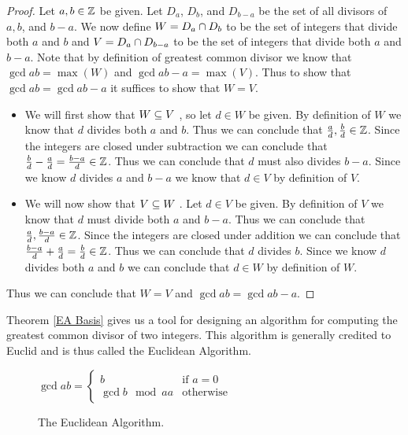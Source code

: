         \begin{proof}
            Let $a, b \in \mathbb{Z}$ be given. Let $D_a$, $D_b$,  and $D_{b - a}$ be the set of all divisors
            of $a, b$, and $b - a$. We now define $W = D_a \cap D_b$ to be the set of integers that
            divide both $a$ and $b$ and $V = D_a \cap D_{b - a}$ to be the set of integers that
            divide both $a$ and $b - a$. Note that by definition of greatest common divisor we know that
            $\gcd{a}{b} = \max(W)$ and $\gcd{a}{b - a} = \max(V)$. Thus to show that $\gcd{a}{b} =
            \gcd{a}{b - a}$ it suffices to show that $W = V$.
            \begin{itemize}
                \item
                    We will first show that $W \subseteq V \ $, so let $d \in W$ be given. By definition
                    of $W$ we know that $d$ divides both $a$ and $b$. Thus we can conclude that
                    $\frac{a}{d}, \frac{b}{d} \in \mathbb{Z}$. Since the integers are closed under subtraction
                    we can conclude that $\frac{b}{d} - \frac{a}{d} = \frac{b - a}{d} \in \mathbb{Z}$.
                    Thus we can conclude that $d$ must also divides $b - a$. Since we know $d$ divides
                    $a$ and $b - a$ we know that $d \in V$ by definition of $V$.
                \item
                    We will now show that $V \subseteq W \ $. Let $d \in V$ be given. By definition of $V$
                    we know that $d$ must divide both $a$ and $b - a$. Thus we can conclude that
                    $\frac{a}{d}, \frac{b - a}{d} \in \mathbb{Z}$. Since the integers are closed under
                    addition we can conclude that $\frac{b - a}{d} + \frac{a}{d} = \frac{b}{d} \in \mathbb{Z}$.
                    Thus we can conclude that $d$ divides $b$. Since we know $d$ divides both $a$
                    and $b$ we can conclude that $d \in W$ by definition of $W$.
            \end{itemize}
            Thus we can conclude that $W = V$ and $\gcd{a}{b} = \gcd{a}{b - a}$. \QED
        \end{proof}
        \begin{algorithm}
            Theorem \ref{EA Basis} gives us a tool for designing an algorithm for computing the greatest
            common divisor of two integers. This algorithm is generally credited to Euclid and is thus called
            the Euclidean Algorithm.
            \begin{figure}[H]
                \centering
                $\gcd{a}{b} = \left\{\begin{array}{ll}
                    b & \mbox{if } a = 0 \\
                    \gcd{b\mod a}{a} & \mbox{otherwise}
                \end{array}\right.$
                \caption{The Euclidean Algorithm.}
            \end{figure}
        \end{algorithm}
